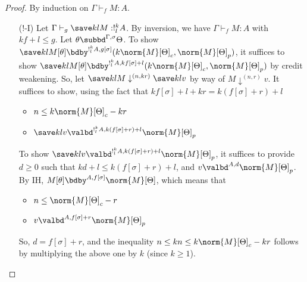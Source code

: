 \bounding*
\begin{proof}
By induction on $\Gamma \vdash_f M : A$.
\begin{itemize}

\item[($!$-I)] 
Let $\Gamma \vdash_g \save k l M : !^k_l A$. By inversion, we have $\Gamma \vdash_f M : A$ with $kf + l \leq g$. Let $\theta \subbd^{\Gamma,\sigma} \Theta$. To show $\save k l {M}[\theta] \bdby^{!^k_l A,g[\sigma]} (k\norm{M}[\Theta]_c,\norm{M}[\Theta]_p)$, it suffices to show $\save k l {M}[\theta] \bdby^{!^k_l A,kf[\sigma] + l} (k\norm{M}[\Theta]_c,\norm{M}[\Theta]_p)$ by credit weakening. So, let $\save k l M \downarrow^{(n,kr)} \save k l v$ by way of $M \downarrow^{(n,r)} v$. It suffices to show, using the fact that $kf[\sigma] + l + kr = k(f[\sigma] + r) + l$
\begin{itemize}
  \item $n \leq k\norm{M}[\Theta]_c - kr$
  \item $\save k l v \valbd^{!^k_l A,k(f[\sigma] + r) + l} \norm{M}[\Theta]_p$
\end{itemize}

To show $\save k l v \valbd^{!^k_l A,k(f[\sigma] + r) + l} \norm{M}[\Theta]_p$, it suffices to provide $d \geq 0$ such that $kd+l \leq k(f[\sigma] + r) + l$, and $v \valbd^{A,d} \norm{M}[\Theta]_p$.
By IH, $M[\theta] \bdby^{A,f[\sigma]} \norm{M}[\Theta]$, which means that
\begin{itemize}
 \item $n \leq \norm{M}[\Theta]_c - r$
 \item $v \valbd^{A,f[\sigma] + r} \norm{M}[\Theta]_p$
\end{itemize}
So, $d = f[\sigma] + r$, and the inequality $n \leq kn \leq k\norm{M}[\Theta]_c - kr$ follows by multiplying the above one by $k$ (since $k \geq 1$).


\end{itemize}
\end{proof}
